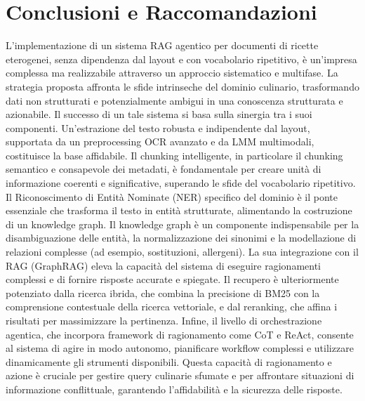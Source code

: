 \documentclass[a4paper, 11pt]{article}
\begin{document}
\section{Conclusioni e Raccomandazioni}
L'implementazione di un sistema RAG agentico per documenti di ricette eterogenei, senza dipendenza dal layout e con vocabolario ripetitivo, è un'impresa complessa ma realizzabile attraverso un approccio sistematico e multifase. La strategia proposta affronta le sfide intrinseche del dominio culinario, trasformando dati non strutturati e potenzialmente ambigui in una conoscenza strutturata e azionabile.
Il successo di un tale sistema si basa sulla sinergia tra i suoi componenti. Un'estrazione del testo robusta e indipendente dal layout, supportata da un preprocessing OCR avanzato e da LMM multimodali, costituisce la base affidabile. Il chunking intelligente, in particolare il chunking semantico e consapevole dei metadati, è fondamentale per creare unità di informazione coerenti e significative, superando le sfide del vocabolario ripetitivo. Il Riconoscimento di Entità Nominate (NER) specifico del dominio è il ponte essenziale che trasforma il testo in entità strutturate, alimentando la costruzione di un knowledge graph.
Il knowledge graph è un componente indispensabile per la disambiguazione delle entità, la normalizzazione dei sinonimi e la modellazione di relazioni complesse (ad esempio, sostituzioni, allergeni). La sua integrazione con il RAG (GraphRAG) eleva la capacità del sistema di eseguire ragionamenti complessi e di fornire risposte accurate e spiegate. Il recupero è ulteriormente potenziato dalla ricerca ibrida, che combina la precisione di BM25 con la comprensione contestuale della ricerca vettoriale, e dal reranking, che affina i risultati per massimizzare la pertinenza.
Infine, il livello di orchestrazione agentica, che incorpora framework di ragionamento come CoT e ReAct, consente al sistema di agire in modo autonomo, pianificare workflow complessi e utilizzare dinamicamente gli strumenti disponibili. Questa capacità di ragionamento e azione è cruciale per gestire query culinarie sfumate e per affrontare situazioni di informazione conflittuale, garantendo l'affidabilità e la sicurezza delle risposte.
\end{document}
